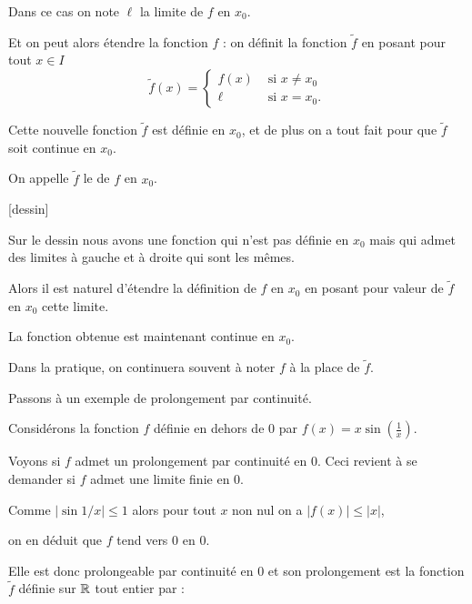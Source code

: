 \change
  
Dans ce cas on note $\ell$ la limite de $f$ en $x_0$.

\change


Et on peut alors étendre la fonction $f$ :
on définit la fonction $\tilde f$  en posant pour tout $x\in I$
  \[
  \tilde f(x) =
  \begin{cases}
  f(x) &\text{ si } x\neq x_0\\
  \ell &\text{ si } x=x_0.
  \end{cases}
  \]
  
  Cette nouvelle fonction $\tilde f$ est définie en $x_0$, et de plus on a tout fait pour que $\tilde f$ soit continue en $x_0$.
  
  On appelle $\tilde f$ le  de $f$ en $x_0$.
  
  [dessin]
  
  Sur le dessin nous avons une fonction qui n'est pas définie en $x_0$ mais qui admet
  des limites à gauche et à droite qui sont les mêmes.
  
  \change
  

  
  Alors il est naturel d'étendre la définition de $f$ en $x_0$ en posant
  pour valeur de $\tilde f$ en $x_0$ cette limite.
  
  La fonction obtenue est maintenant continue en $x_0$.

Dans la pratique, on continuera souvent à noter $f$ à la place de $\tilde f$.

\diapo


Passons à un exemple de prolongement par continuité.


Considérons la fonction $f$ définie en dehors de $0$ par $f(x)=x\sin\left(\frac1x\right)$. 

Voyons si $f$ admet un prolongement par continuité en $0$. Ceci revient à se demander si $f$ admet une limite finie en $0$.

\change

Comme $|\sin 1/x| \le 1$ alors pour tout $x$ non nul 
on a $\vert f(x)\vert\leq \vert x\vert$, 

\change

on en déduit que $f$ tend vers $0$ en $0$. 

\change


Elle est donc prolongeable par continuité en $0$ et son prolongement est la fonction $\tilde f$ 
définie sur $\mathbb{R}$ tout entier par :


